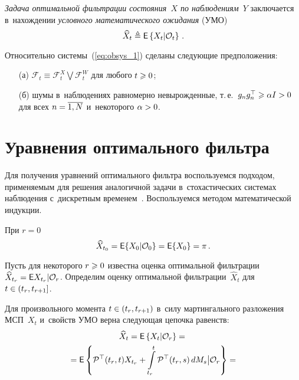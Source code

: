 \begin{multicols}{2}
   \textit{Задача оптимальной фильтрации состояния~$X$ по наблюдениям~$Y$} 
   заключается в~нахождении \textit{условного математического ожидания} (УМО)
  \begin{equation*}
  \widehat{X}_t \triangleq {\sf E}\left\{X_t|\mathcal{O}_{t} \right\}\,.
  \end{equation*}
  
  Относительно системы~(\ref{eq:obsys_1})  сделаны следующие предположения:
   \begin{itemize}
 \item[(а)]
 ${\mathcal{F}}_t \equiv {\mathcal{F}}_{t}^X \bigvee 
 {\mathcal{F}}_{t}^W $ для любого $t \hm\geqslant 0$;
 \item[(б)]
 шумы в~наблюдениях равномерно невырожденные, т.\,е.\
  $g_ng_n^{\top} \hm\geqslant \alpha I \hm> 0$ для всех $n\hm=\overline{1,N}$ 
  и~некоторого $\alpha\hm>0$.
 \end{itemize} 

 \section{Уравнения оптимального фильтра} 
 
 Для получения уравнений оптимального фильт\-ра воспользуемся подходом, 
 применяемым для решения аналогичной задачи в~стохастических сис\-те\-мах 
 наблюдения с~дискретным временем~\cite{BSh_85}. 
 Воспользу\-ем\-ся методом математической индукции. 
 
 При $r=0$ 
 \begin{equation}
 \widehat{X}_{t_0}={\sf E}\{X_0|\mathcal{O}_0\}={\sf E}\{X_0\}=\pi\,.
 \label{eq:in_cond}
 \end{equation} 
 
 Пусть для некоторого $ r \hm\geqslant 0$ известна оценка оптимальной 
 фильтрации~$\widehat{X}_{t_r} \hm= {\sf E}{X_{t_r} |\mathcal{O}_r}$. 
 Определим оценку оптимальной фильтрации~$\widehat{X}_{t} $ для $t\hm \in (t_r,t_{r+1}]$. 
 
 Для произвольного момента $t \hm\in (t_r,t_{r+1})$ в~силу мартингального 
 разложения МСП~$X_t$ и~свойств УМО верна следующая цепочка равенств:
 \begin{multline*}
 \widehat{X}_{t} = {\sf E}\left\{X_t | \mathcal{O}_r\right\}={}\\
 {}=
 {\sf E}\left\{{\cal P}^{\top}(t_r,t)X_{t_r}+
 \int\limits_{t_r}^t{\cal P}^{\top}(t_r,s)\,dM_s\big\vert \mathcal{O}_r\right\} = {}
\end{multline*}


\end{multicols}

